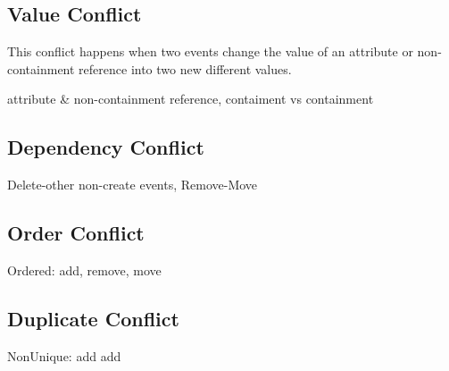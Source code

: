\subsection{Value Conflict}
This conflict happens when two events change the value of an attribute or non-containment reference into two new different values. 

attribute \& non-containment reference, contaiment vs containment

\subsection{Dependency Conflict}
Delete-other non-create events, Remove-Move

\subsection{Order Conflict}
Ordered: add, remove, move

\subsection{Duplicate Conflict}
NonUnique: add add

